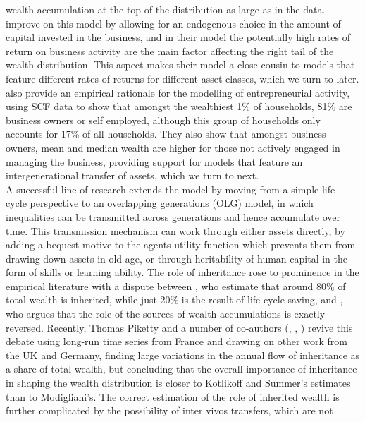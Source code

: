 wealth accumulation at the top of the distribution as large as in the data. 
\citet{CagettiDeNardi2006} improve on this model by allowing for an endogenous
choice in the amount of capital invested in the business, and in their model the
potentially high rates of return on business activity are the main factor 
affecting the right tail of the wealth distribution. This aspect makes their 
model a close cousin to models that feature different rates of returns for 
different asset classes, which we turn to later. \citet{CagettiDeNardi2006}
also provide an empirical rationale for the modelling of entrepreneurial 
activity, using SCF data to show that amongst the wealthiest 1\% of households,
81\% are business owners or self employed, although this group of households 
only accounts for 17\% of all households. They also show that amongst business
owners, mean and median wealth are higher for those not actively engaged in 
managing the business, providing support for models that feature an intergenerational
transfer of assets, which we turn to next.
\vspace{0.5cm} \\
A successful line of research extends the model by moving from a simple life-
cycle perspective to an overlapping generations (OLG) model, in which inequalities
can be transmitted across generations and hence accumulate over time. This 
transmission mechanism can work through either assets directly, by adding 
a bequest motive to the agents utility function which prevents them from drawing
down assets in old age, or through heritability of human capital in the form 
of skills or learning ability. The role of inheritance rose to prominence in the 
empirical literature with a dispute between \citet{KotlikoffSummers1981}, who 
estimate that around 80\% of total wealth is inherited, while just 20\% is 
the result of life-cycle saving, and \citet{Modigliani1986}, who argues that the 
role of the sources of wealth accumulations is exactly reversed. Recently, Thomas
Piketty and a number of co-authors (\citealt{Piketty2011}, 
\citealt{PikettyPostelRosenthal2014}, \citealt{PikettyZucman2015}) revive this
debate using long-run time series from France and drawing on other work from 
the UK and Germany, finding large variations in the annual flow of inheritance
as a share of total wealth, but concluding that the overall importance of inheritance
in shaping the wealth distribution is closer to Kotlikoff and Summer's estimates
than to Modigliani's. The correct estimation of the role of inherited wealth is
further complicated by the possibility of inter vivos transfers, which are not
